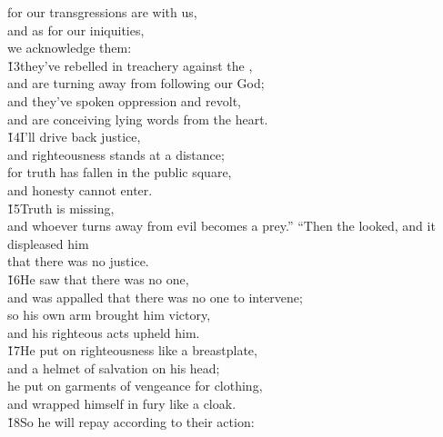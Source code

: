 \begin{poetry}
\poeml for our transgressions are with us, \\
\poemll    and as for our iniquities, \\
\poemlll       we acknowledge them: \\
\poeml \v{13}they've rebelled in treachery against the , \\
\poemll    and are turning away from following our God; \\
\poeml and they've spoken oppression and revolt, \\
\poemll    and are conceiving lying words from the heart. \\
\poeml \v{14}I'll drive back justice, \\
\poemll    and righteousness stands at a distance; \\
\poeml for truth has fallen in the public square, \\
\poemll    and honesty cannot enter. \\
\poeml \v{15}Truth is missing, \\
\poemll    and whoever turns away from evil becomes a prey.''
\poeml ``Then the  looked, and it displeased him \\
\poemll    that there was no justice. \\
\poeml \v{16}He saw that there was no one, \\
\poemll    and was appalled that there was no one to intervene; \\
\poeml so his own arm brought him victory, \\
\poemll    and his righteous acts upheld him. \\
\poeml \v{17}He put on righteousness like a breastplate, \\
\poemll    and a helmet of salvation on his head; \\
\poeml he put on garments of vengeance for clothing, \\
\poemll    and wrapped himself in fury like a cloak. \\
\poeml \v{18}So he will repay according to their action: \\

\end{poetry}
